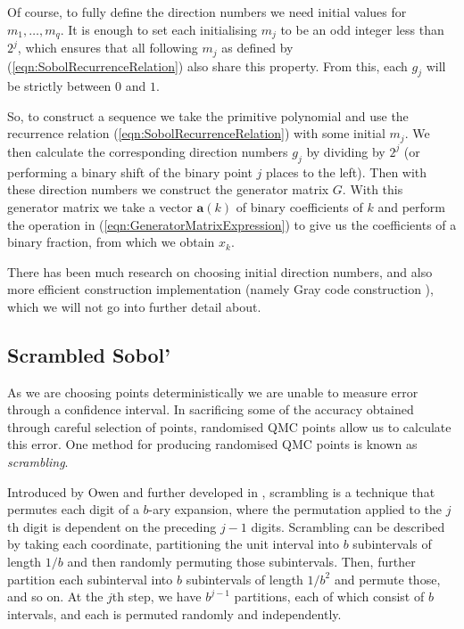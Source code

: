 Of course, to fully define the direction numbers we need initial values for $m_1,\dots,m_q$. It is enough to set each initialising $m_j$ to be an odd integer less than $2^j$, which ensures that all following $m_j$ as defined by (\ref{eqn:SobolRecurrenceRelation}) also share this property. From this, each $g_j$ will be strictly between $0$ and $1$.

So, to construct a sequence we take the primitive polynomial and use the recurrence relation (\ref{eqn:SobolRecurrenceRelation}) with some initial $m_j$. We then calculate the corresponding direction numbers $g_j$ by dividing by $2^j$ (or performing a binary shift of the binary point $j$ places to the left). Then with these direction numbers we construct the generator matrix $G$. With this generator matrix we take a vector $\boldsymbol{a}(k)$ of binary coefficients of $k$ and perform the operation in (\ref{eqn:GeneratorMatrixExpression}) to give us the coefficients of a binary fraction, from which we obtain $x_k$.

There has been much research on choosing initial direction numbers, and also more efficient construction implementation (namely Gray code construction \cite{GrayCodeConstruction}), which we will not go into further detail about.

\subsection{Scrambled Sobol'} \label{sec:ScrambledSobol}
As we are choosing points deterministically we are unable to measure error through a confidence interval. In sacrificing some of the accuracy obtained through careful selection of points, randomised QMC points allow us to calculate this error. One method for producing randomised QMC points is known as \textit{scrambling}.

Introduced by Owen and further developed in \cite{OwenScrambling}, scrambling is a technique that permutes each digit of a $b$-ary expansion, where the permutation applied to the $j$th digit is dependent on the preceding $j-1$ digits. Scrambling can be described by taking each coordinate, partitioning the unit interval into $b$ subintervals of length $1/b$ and then randomly permuting those subintervals. Then, further partition each subinterval into $b$ subintervals of length $1/b^2$ and permute those, and so on. At the $j$th step, we have $b^{j-1}$ partitions, each of which consist of $b$ intervals, and each is permuted randomly and independently.

